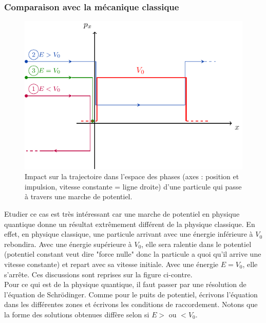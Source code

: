 \documentclass{book}
\begin{document}
\subsubsection{Comparaison avec la mécanique classique}
\begin{figure}%
  \centering
  \includegraphics[width=.9\linewidth]{images/marche_potentiel_classique.pdf}
  \caption{Impact sur la trajectoire dans l'espace des phases (axes : position et impulsion, vitesse constante = ligne droite) d'une particule qui passe à travers une marche de potentiel.}
  \label{fig:ch2-marche_potentiel_classique}
  \end{figure}

Etudier ce cas est très intéressant car une marche de potentiel en physique quantique donne un résultat extrêmement différent de la physique classique. En effet, en physique classique, une particule arrivant avec une énergie inférieure à $V_0$ rebondira. Avec une énergie supérieure à $V_0$, elle sera ralentie dans le potentiel (potentiel constant veut dire "force nulle" donc la particule a quoi qu'il arrive une vitesse constante) et repart avec sa vitesse initiale. Avec une énergie $E= V_0$, elle s'arrête.  Ces discussions sont reprises sur la figure ci-contre. \\

Pour ce qui est de la physique quantique, il faut passer par une résolution de l'équation de Schrödinger. Comme pour le puits de potentiel, écrivons l'équation dans les différentes zones et écrivons les conditions de raccordement. Notons que la forme des solutions obtenues diffère selon si $E>$ ou $< V_0$.
\end{document}
